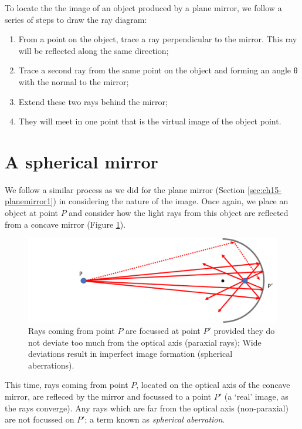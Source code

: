 \documentclass[
]{book}
\providecommand{\tightlist}{%
  \setlength{\itemsep}{0pt}\setlength{\parskip}{0pt}}
\begin{document}
To locate the the image of an object produced by a plane mirror, we follow a series of steps to draw the ray diagram:

\begin{enumerate}
\def\labelenumi{\arabic{enumi}.}
\tightlist
\item
  From a point on the object, trace a ray perpendicular to the mirror. This ray will be reflected along the same direction;
\item
  Trace a second ray from the same point on the object and forming an angle θ with the normal to the mirror;
\item
  Extend these two rays behind the mirror;
\item
  They will meet in one point that is the virtual image of the object point.
\end{enumerate}

\hypertarget{sec:ch15-sphericalmirror1}{%
\section{A spherical mirror}\label{sec:ch15-sphericalmirror1}}

We follow a similar process as we did for the plane mirror (Section \ref{sec:ch15-planemirror1}) in considering the nature of the image. Once again, we place an object at point \(P\) and consider how the light rays from this object are reflected from a concave mirror (Figure \ref{fig:ch15-sphericalconcave1}).\\

\begin{figure}

{\centering \includegraphics[width=0.7\linewidth]{visualisations/LaTeX/ch15-sphericalmirror1} 

}

\caption{Rays coming from point $P$ are focussed at point $P'$ provided they do not deviate too much from the optical axis (paraxial rays); Wide deviations result in imperfect image formation (spherical aberrations).}\label{fig:ch15-sphericalconcave1}
\end{figure}

This time, rays coming from point \(P\), located on the optical axis of the concave mirror, are refleced by the mirror and focussed to a point \(P'\) (a `real' image, as the rays converge). Any rays which are far from the optical axis (non-paraxial) are not focussed on \(P'\); a term known as \emph{spherical aberration}.
\end{document}
